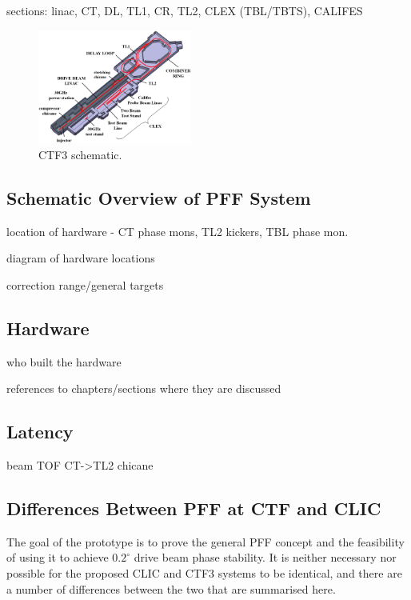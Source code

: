 sections: linac, CT, DL, TL1, CR, TL2, CLEX (TBL/TBTS), CALIFES

\begin{figure}
  \centering
  \includegraphics[width=0.45\textwidth]{Figures/ctfLayout}
  \caption{CTF3 schematic.}
  \label{f:ctfLayout}
\end{figure}


\subsection{Schematic Overview of PFF System}
\label{ss:ctfPFFLayout}

location of hardware - CT phase mons, TL2 kickers, TBL phase mon.

diagram of hardware locations

correction range/general targets

\subsection{Hardware}
\label{ss:ctfPFFHardware}

who built the hardware

references to chapters/sections where they are discussed

\subsection{Latency}
\label{ss:availLatency}

beam TOF CT->TL2 chicane

\subsection{Differences Between PFF at CTF and CLIC}
\label{ss:ctfVsCLIC}

The goal of the prototype is to prove the general PFF concept and the feasibility of using it to achieve \(0.2^\circ\) drive beam phase stability. It is neither necessary nor possible for the proposed CLIC and CTF3 systems to be identical, and there are a number of differences between the two that are summarised here. 

